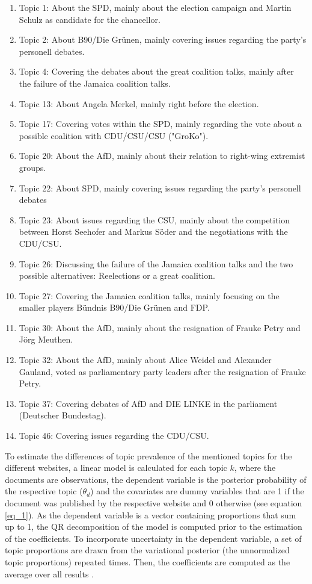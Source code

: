 \documentclass[12pt,a4paper,notitlepage]{article}
\begin{document}
\begin{enumerate}
	\item Topic 1: About the SPD, mainly about the election campaign and Martin Schulz as candidate for the chancellor.	
	\item Topic 2: About B90/Die Grünen, mainly covering issues regarding the party's personell debates.
	\item Topic 4: Covering the debates about the great coalition talks, mainly after the failure of the Jamaica coalition talks.
	\item Topic 13: About Angela Merkel, mainly right before the election. 
	\item Topic 17: Covering votes within the SPD, mainly regarding the vote about a possible coalition with CDU/CSU/CSU ("GroKo").	
	\item Topic 20: About the AfD, mainly about their relation to right-wing extremist groups.
	\item Topic 22: About SPD, mainly covering issues regarding the party's personell debates
	\item Topic 23: About issues regarding the CSU, mainly about the competition between Horst Seehofer and Markus Söder and the negotiations with the CDU/CSU.
	\item Topic 26: Discussing the failure of the Jamaica coalition talks and the two possible alternatives: Reelections or a great coalition.
	\item Topic 27: Covering the Jamaica coalition talks, mainly focusing on the smaller players Bündnis B90/Die Grünen and FDP.	
	\item Topic 30: About the AfD, mainly about the resignation of Frauke Petry and Jörg Meuthen.
	\item Topic 32: About the AfD, mainly about Alice Weidel and Alexander Gauland, voted as parliamentary party leaders after the resignation of Frauke Petry.
	\item Topic 37: Covering debates of AfD and DIE LINKE in the parliament (Deutscher Bundestag).
	\item Topic 46: Covering issues regarding the CDU/CSU.
\end{enumerate}   

To estimate the differences of topic prevalence of the mentioned topics for the different websites, a linear model is calculated for each topic $k$, where the documents are observations, the dependent variable is the posterior probability of the respective topic ($\theta_{d}$) and the covariates are dummy variables that are 1 if the document was published by the respective website and 0 otherwise (see equation \ref{eq_1}). As the dependent variable is a vector containing proportions that sum up to 1, the QR decomposition of the model is computed prior to the estimation of the coefficients. To incorporate uncertainty in the dependent variable, a set of topic proportions are drawn from the variational posterior (the unnormalized topic proportions) repeated times. Then, the coefficients are computed as the average over all results \citep{roberts_model_2016}.
\end{document}

